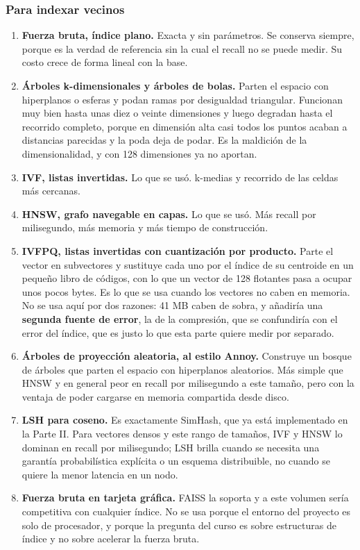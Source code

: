 \documentclass[11pt]{article}
\begin{document}
\subsubsection*{Para indexar vecinos}
\begin{enumerate}
  \item \textbf{Fuerza bruta, índice plano.} Exacta y sin parámetros. Se conserva siempre, porque es la verdad de referencia sin la cual el recall no se puede medir. Su costo crece de forma lineal con la base.
  \item \textbf{Árboles k-dimensionales y árboles de bolas.} Parten el espacio con hiperplanos o esferas y podan ramas por desigualdad triangular. Funcionan muy bien hasta unas diez o veinte dimensiones y luego degradan hasta el recorrido completo, porque en dimensión alta casi todos los puntos acaban a distancias parecidas y la poda deja de podar. Es la maldición de la dimensionalidad, y con 128 dimensiones ya no aportan.
  \item \textbf{IVF, listas invertidas.} Lo que se usó. k-medias y recorrido de las celdas más cercanas.
  \item \textbf{HNSW, grafo navegable en capas.} Lo que se usó. Más recall por milisegundo, más memoria y más tiempo de construcción.
  \item \textbf{IVFPQ, listas invertidas con cuantización por producto.} Parte el vector en subvectores y sustituye cada uno por el índice de su centroide en un pequeño libro de códigos, con lo que un vector de 128 flotantes pasa a ocupar unos pocos bytes. Es lo que se usa cuando los vectores no caben en memoria. No se usa aquí por dos razones: 41 MB caben de sobra, y añadiría una \textbf{segunda fuente de error}, la de la compresión, que se confundiría con el error del índice, que es justo lo que esta parte quiere medir por separado.
  \item \textbf{Árboles de proyección aleatoria, al estilo Annoy.} Construye un bosque de árboles que parten el espacio con hiperplanos aleatorios. Más simple que HNSW y en general peor en recall por milisegundo a este tamaño, pero con la ventaja de poder cargarse en memoria compartida desde disco.
  \item \textbf{LSH para coseno.} Es exactamente SimHash, que ya está implementado en la Parte II. Para vectores densos y este rango de tamaños, IVF y HNSW lo dominan en recall por milisegundo; LSH brilla cuando se necesita una garantía probabilística explícita o un esquema distribuible, no cuando se quiere la menor latencia en un nodo.
  \item \textbf{Fuerza bruta en tarjeta gráfica.} FAISS la soporta y a este volumen sería competitiva con cualquier índice. No se usa porque el entorno del proyecto es solo de procesador, y porque la pregunta del curso es sobre estructuras de índice y no sobre acelerar la fuerza bruta.
\end{enumerate}
\end{document}
